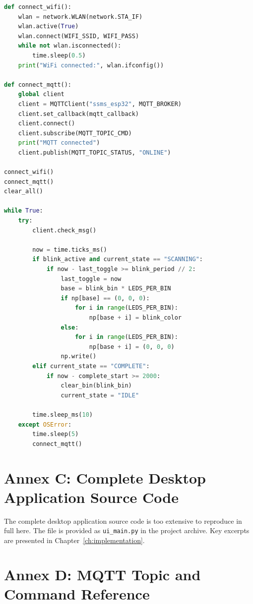 \begin{lstlisting}[language=Python, caption=Complete MicroPython main.py, label=lst:fw-main]
def connect_wifi():
    wlan = network.WLAN(network.STA_IF)
    wlan.active(True)
    wlan.connect(WIFI_SSID, WIFI_PASS)
    while not wlan.isconnected():
        time.sleep(0.5)
    print("WiFi connected:", wlan.ifconfig())

def connect_mqtt():
    global client
    client = MQTTClient("ssms_esp32", MQTT_BROKER)
    client.set_callback(mqtt_callback)
    client.connect()
    client.subscribe(MQTT_TOPIC_CMD)
    print("MQTT connected")
    client.publish(MQTT_TOPIC_STATUS, "ONLINE")

connect_wifi()
connect_mqtt()
clear_all()

while True:
    try:
        client.check_msg()

        now = time.ticks_ms()
        if blink_active and current_state == "SCANNING":
            if now - last_toggle >= blink_period // 2:
                last_toggle = now
                base = blink_bin * LEDS_PER_BIN
                if np[base] == (0, 0, 0):
                    for i in range(LEDS_PER_BIN):
                        np[base + i] = blink_color
                else:
                    for i in range(LEDS_PER_BIN):
                        np[base + i] = (0, 0, 0)
                np.write()
        elif current_state == "COMPLETE":
            if now - complete_start >= 2000:
                clear_bin(blink_bin)
                current_state = "IDLE"

        time.sleep_ms(10)
    except OSError:
        time.sleep(5)
        connect_mqtt()
\end{lstlisting}

\section{Annex C: Complete Desktop Application Source Code}
\label{annex:app-code}

The complete desktop application source code is too extensive to reproduce in full here. The file is provided as \texttt{ui\_main.py} in the project archive. Key excerpts are presented in Chapter~\ref{ch:implementation}.

\section{Annex D: MQTT Topic and Command Reference}
\label{annex:mqtt-ref}

